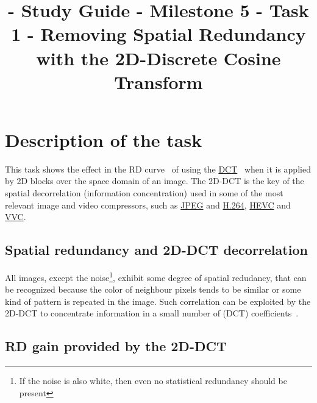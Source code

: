 

\title{\SM{} - Study Guide - Milestone 5 - Task 1 - Removing Spatial Redundancy with the 2D-Discrete Cosine Transform}

\maketitle

\tableofcontents

\section{Description of the task}

This task shows the effect in the RD
curve~\cite{vruiz__information_theory} of using the
\href{https://en.wikipedia.org/wiki/Discrete_cosine_transform}{DCT}~\cite{vruiz__DCT}
when it is applied by 2D blocks over the space domain of an image. The
2D-DCT is the key of the spatial decorrelation (information
concentration) used in some of the most relevant image and video
compressors, such as \href{https://en.wikipedia.org/wiki/JPEG}{JPEG}
and \href{https://en.wikipedia.org/wiki/Advanced_Video_Coding}{H.264},
\href{https://en.wikipedia.org/wiki/Advanced_Video_Coding}{HEVC} and
\href{https://en.wikipedia.org/wiki/Versatile_Video_Coding}{VVC}.

\subsection{Spatial redundancy and 2D-DCT decorrelation}

All images, except the noise\footnote{If the noise is also white, then
even no statistical redundancy should be present}, exhibit some degree
of spatial redudancy, that can be recognized because the color of
neighbour pixels tends to be similar or some kind of pattern is
repeated in the image. Such correlation can be exploited by the 2D-DCT to
concentrate information in a small number of (DCT)
coefficients~\cite{vruiz__DCT}.

\subsection{RD gain provided by the 2D-DCT}

